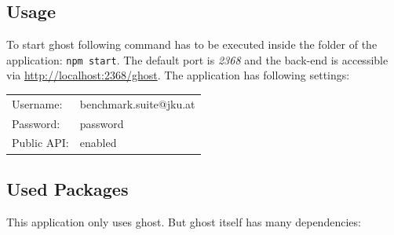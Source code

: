 	\subsection{Usage}
	To start ghost following command has to be executed inside the folder of the application: \texttt{npm start}.
	The default port is \textit{2368} and the back-end is accessible via \url{http://localhost:2368/ghost}. The application has following settings:
	
	\begin{tabular}{ll}
		Username: & benchmark.suite@jku.at\\
		Password: & password\\
		Public API: & enabled  \\
	\end{tabular}
	
	\subsection{Used Packages}
	This application only uses ghost\cite{ghost-npm}. But ghost itself has many dependencies:

